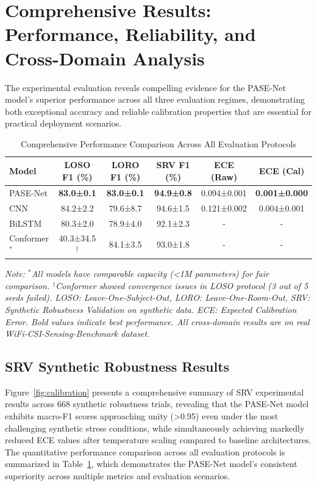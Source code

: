 \documentclass[lettersize,journal]{IEEEtran}
\begin{document}
\section{Comprehensive Results: Performance, Reliability, and Cross-Domain Analysis}

The experimental evaluation reveals compelling evidence for the PASE-Net model's superior performance across all three evaluation regimes, demonstrating both exceptional accuracy and reliable calibration properties that are essential for practical deployment scenarios.

\begin{table}[t]
\centering
\caption{Comprehensive Performance Comparison Across All Evaluation Protocols}
\label{tab:performance_comparison}
\small
\begin{tabular}{@{}lccccc@{}}
\toprule
\textbf{Model} & \textbf{LOSO F1 (\%)} & \textbf{LORO F1 (\%)} & \textbf{SRV F1 (\%)} & \textbf{ECE (Raw)} & \textbf{ECE (Cal)} \\
\midrule
PASE-Net & \textbf{83.0±0.1} & \textbf{83.0±0.1} & \textbf{94.9±0.8} & 0.094±0.001 & \textbf{0.001±0.000} \\
CNN & 84.2±2.2 & 79.6±8.7 & 94.6±1.5 & 0.121±0.002 & 0.004±0.001 \\
BiLSTM & 80.3±2.0 & 78.9±4.0 & 92.1±2.3 & - & - \\
Conformer$^*$ & 40.3±34.5$^\dagger$ & 84.1±3.5 & 93.0±1.8 & - & - \\
\bottomrule
\end{tabular}
\textit{Note: $^*$All models have comparable capacity (<1M parameters) for fair comparison. $^\dagger$Conformer showed convergence issues in LOSO protocol (3 out of 5 seeds failed).
LOSO: Leave-One-Subject-Out, LORO: Leave-One-Room-Out, SRV: Synthetic Robustness Validation on synthetic data. ECE: Expected Calibration Error. Bold values indicate best performance. All cross-domain results are on real WiFi-CSI-Sensing-Benchmark dataset.}
\end{table}

\subsection{SRV Synthetic Robustness Results}

Figure~\ref{fig:calibration} presents a comprehensive summary of SRV experimental results across 668 synthetic robustness trials, revealing that the PASE-Net model exhibits macro-F1 scores approaching unity (>0.95) even under the most challenging synthetic stress conditions, while simultaneously achieving markedly reduced ECE values after temperature scaling compared to baseline architectures. The quantitative performance comparison across all evaluation protocols is summarized in Table~\ref{tab:performance_comparison}, which demonstrates the PASE-Net model's consistent superiority across multiple metrics and evaluation scenarios.
\end{document}
